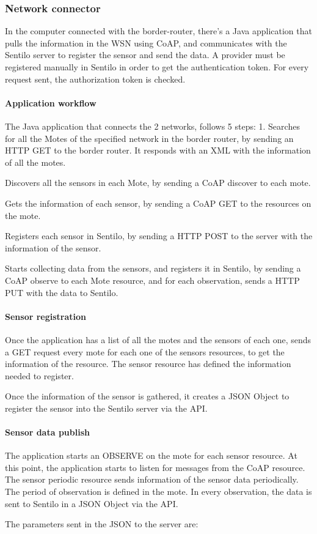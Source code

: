 \subsubsection{Network connector}
In the computer connected with the border-router,
	there's a Java application that pulls the information in the WSN using CoAP,
	and communicates with the Sentilo server to register the sensor and send the data.
A provider must be registered manually in Sentilo in order to get the authentication token.
For every request sent,
	the authorization token is checked.


\paragraph{Application workflow}
The Java application that connects the 2 networks,
	follows 5 steps: 1.
Searches for all the Motes of the specified network in the border router,
	by sending an HTTP GET to the border router.
It responds with an XML with the information of all the motes.

Discovers all the sensors in each Mote,
	by sending a CoAP discover to each mote.


Gets the information of each sensor,
	by sending a CoAP GET to the resources on the mote.


Registers each sensor in Sentilo,
	by sending a HTTP POST to the server with the information of the sensor.

Starts collecting data from the sensors,
	and registers it in Sentilo,
	by sending a CoAP observe to each Mote resource,
	and for each observation,
	sends a HTTP PUT with the data to Sentilo.

\paragraph{Sensor registration}
Once the application has a list of all the motes and the sensors of each one,
	sends a GET request every mote for each one of the sensors resources,
	to get the information of the resource.
The sensor resource has defined the information needed to register.

Once the information of the sensor is gathered,
	it creates a JSON Object to register the sensor into the Sentilo server via the API.

\paragraph{Sensor data publish}
The application starts an OBSERVE on the mote for each sensor resource.
At this point,
	the application starts to listen for messages from the CoAP resource.
The sensor periodic resource sends information of the sensor data periodically.
The period of observation is defined in the mote.
In every observation,
	the data is sent to Sentilo in a JSON Object via the API.

The parameters sent in the JSON to the server are:













